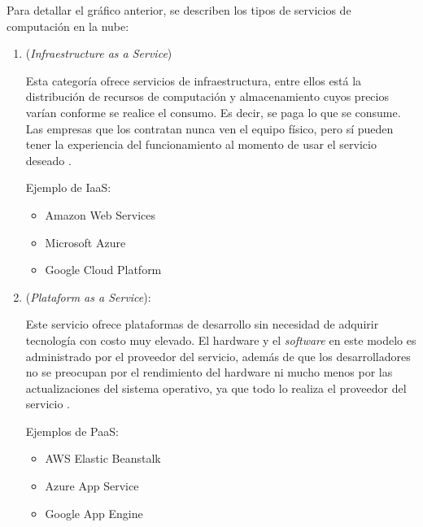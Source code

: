 
Para detallar el gráfico anterior, se describen los tipos de servicios de computación en la nube:

\vspace{1cm}

\begin{enumerate}

\item {}  (\emph{Infraestructure  as  a  Service})

Esta categoría ofrece servicios de infraestructura, entre ellos está la distribución de recursos de computación y almacenamiento cuyos precios varían conforme se realice el consumo. Es decir, se paga lo que se consume. Las empresas que los contratan nunca ven el equipo físico, pero sí pueden tener la experiencia del funcionamiento al momento de usar el servicio deseado \citep{BOOK:2}.

Ejemplo de IaaS:

\begin{itemize}
\item Amazon Web Services
\item Microsoft Azure
\item Google Cloud Platform
\end{itemize}

\vspace{0.5cm}

\item {} (\emph{Plataform as a Service}):

Este servicio ofrece plataformas de desarrollo sin necesidad de adquirir tecnología con costo muy elevado. El hardware y el \emph{software} en este modelo es administrado por el proveedor del servicio, además de que los desarrolladores no se preocupan por el rendimiento del hardware ni mucho menos por las actualizaciones del sistema operativo, ya que todo lo realiza el proveedor del servicio \citep{BOOK:2}.
 
Ejemplos de PaaS:

\begin{itemize}
\item AWS Elastic Beanstalk
\item Azure App Service
\item Google App Engine

\end{itemize}

\vspace{0.5cm}


\end{enumerate}
